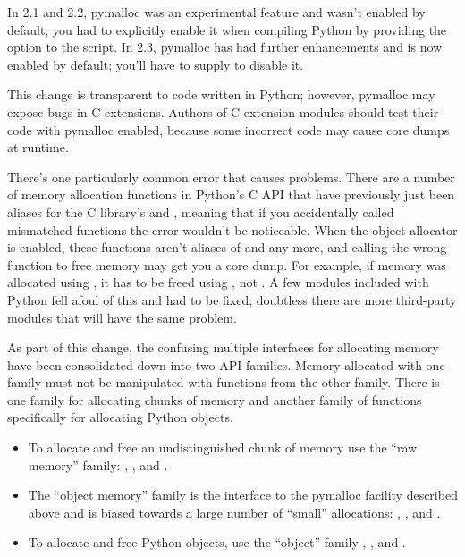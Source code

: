 \documentclass{howto}
\begin{document}
In 2.1 and 2.2, pymalloc was an experimental feature and wasn't
enabled by default; you had to explicitly enable it when compiling
Python by providing the
 option to the 
script.  In 2.3, pymalloc has had further enhancements and is now
enabled by default; you'll have to supply
 to disable it.

This change is transparent to code written in Python; however,
pymalloc may expose bugs in C extensions.  Authors of C extension
modules should test their code with pymalloc enabled,
because some incorrect code may cause core dumps at runtime.  

There's one particularly common error that causes problems.  There are
a number of memory allocation functions in Python's C API that have
previously just been aliases for the C library's 
and , meaning that if you accidentally called
mismatched functions the error wouldn't be noticeable.  When the
object allocator is enabled, these functions aren't aliases of
 and  any more, and calling the
wrong function to free memory may get you a core dump.  For example,
if memory was allocated using , it has to
be freed using , not .  A
few modules included with Python fell afoul of this and had to be
fixed; doubtless there are more third-party modules that will have the
same problem.

As part of this change, the confusing multiple interfaces for
allocating memory have been consolidated down into two API families.
Memory allocated with one family must not be manipulated with
functions from the other family.  There is one family for allocating
chunks of memory and another family of functions specifically for
allocating Python objects.

\begin{itemize}
  \item To allocate and free an undistinguished chunk of memory use
  the ``raw memory'' family: ,
  , and .

  \item The ``object memory'' family is the interface to the pymalloc
  facility described above and is biased towards a large number of
  ``small'' allocations: ,
  , and .

  \item To allocate and free Python objects, use the ``object'' family
  , , and
  .
\end{itemize}
\end{document}
